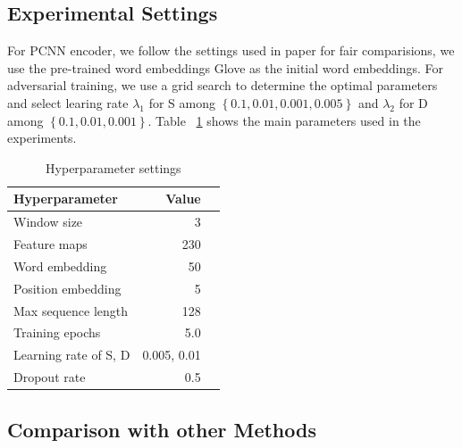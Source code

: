 \documentclass[conference]{IEEEtran}
\begin{document}
\subsection{Experimental Settings}
\label{subsect:hyper}
For PCNN encoder, we follow the settings used in paper\cite{zeng2015distant} for fair comparisions,
we use the pre-trained word embeddings Glove \cite{pennington2014glove} as the initial word embeddings.
For adversarial training, we use a grid search to determine the optimal parameters and select learing rate $\lambda_{1}$ for S among $\left \{0.1, 0.01, 0.001, 0.005  \right \}$ and $\lambda_{2}$ for D among $\left \{0.1, 0.01, 0.001 \right \}$.  
Table ~\ref{parameters} shows the main parameters used in the experiments.
\begin{table}
\caption{\label{parameters} Hyperparameter settings}
  \centering
  \begin{tabular}{lrl}
  \hline \textbf{Hyperparameter} & \textbf{Value}\\ \hline
  Window size & 3\\
  Feature maps & 230\\
  Word embedding & 50\\
  Position embedding & 5\\
  Max sequence length & 128\\
  Training epochs & 5.0\\
  Learning rate of S, D & 0.005, 0.01\\
  Dropout rate & 0.5\\
  \hline
  \end{tabular}
  
  \end{table}

\subsection{Comparison with other Methods}
\end{document}
